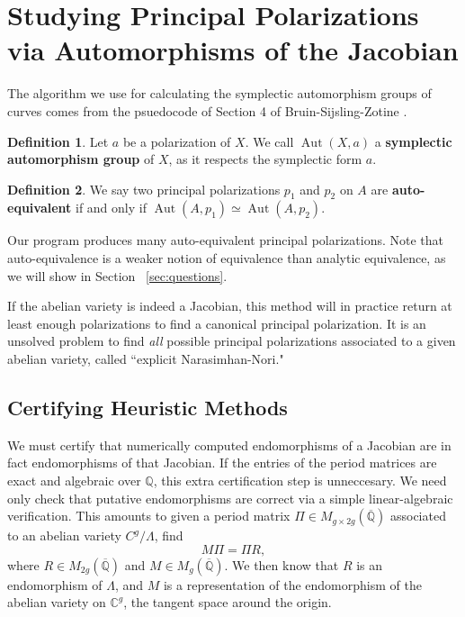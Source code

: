 \documentclass[12pt,reqno]{amsart}
\DeclareMathOperator{\Aut}{Aut}
\newcommand{\C}{\mathbb{C}}
\newcommand{\Q}{\mathbb{Q}}
\theoremstyle{definition}
\newtheorem{defn}{Definition}
\theoremstyle{remark}
\begin{document}
\section{Studying Principal Polarizations via Automorphisms of the Jacobian}

The algorithm we use for calculating the symplectic automorphism groups of curves comes from the psuedocode of Section 4 of Bruin-Sijsling-Zotine \cite{numerical}. 

\begin{defn} Let $a$ be a polarization of $X$. We call $\Aut(X, a)$ a \textbf{symplectic automorphism group} of $X$, as it respects the symplectic form $a$. 
\end{defn}

\begin{defn} We say two principal polarizations $p_1$ and $p_2$ on $A$ are \textbf{auto-equivalent} if and only if $\Aut(A, p_1) \simeq \Aut(A, p_2)$. \end{defn}

Our program produces many auto-equivalent principal polarizations.  Note that auto-equivalence is a weaker notion of equivalence than analytic equivalence, as we will show in Section ~\ref{sec:questions}. 

If the abelian variety is indeed a Jacobian, this method will in practice return at least enough polarizations to find a canonical principal polarization. It is an unsolved problem to find \textit{all} possible principal polarizations associated to a given abelian variety, called ``explicit Narasimhan-Nori."

\subsection{Certifying Heuristic Methods}
\label{sec:cert}

We must certify that numerically computed endomorphisms of a Jacobian are in fact endomorphisms of that Jacobian. If the entries of the period matrices are exact and algebraic over $\Q$, this extra certification step is unneccesary. We need only check that putative endomorphisms are correct via a simple linear-algebraic verification. This amounts to given a period matrix $\Pi \in M_{g \times 2g}(\overline{\Q})$ associated to an abelian variety $C^g/\Lambda$, find
$$M \Pi = \Pi R,$$
where $R \in  M_{2g}(\overline{\Q})$ and $M \in M_{g}(\overline{\Q})$. We then know that $R$ is an endomorphism of $\Lambda$, and $M$ is a representation of the endomorphism of the abelian variety on $\C^g$, the tangent space around the origin.
\end{document}
